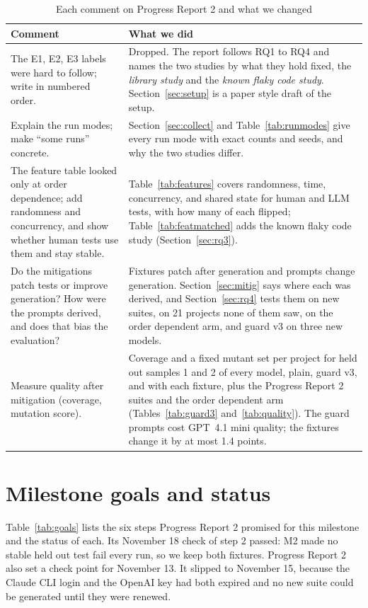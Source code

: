\documentclass[sigconf,nonacm]{acmart}
\begin{document}
\begin{table}[t]
\caption{Each comment on Progress Report 2 and what we changed}
\label{tab:response}
\small
\begin{tabularx}{\textwidth}{p{5.2cm}X}
\toprule
Comment & What we did \\
\midrule
The E1, E2, E3 labels were hard to follow; write in numbered order. & Dropped. The report follows RQ1 to RQ4 and names the two studies by what they hold fixed, the \emph{library study} and the \emph{known flaky code study}. Section~\ref{sec:setup} is a paper style draft of the setup. \\
Explain the run modes; make ``some runs'' concrete. & Section~\ref{sec:collect} and Table~\ref{tab:runmodes} give every run mode with exact counts and seeds, and why the two studies differ. \\
The feature table looked only at order dependence; add randomness and concurrency, and show whether human tests use them and stay stable. & Table~\ref{tab:features} covers randomness, time, concurrency, and shared state for human and LLM tests, with how many of each flipped; Table~\ref{tab:featmatched} adds the known flaky code study (Section~\ref{sec:rq3}). \\
Do the mitigations patch tests or improve generation? How were the prompts derived, and does that bias the evaluation? & Fixtures patch after generation and prompts change generation. Section~\ref{sec:mitig} says where each was derived, and Section~\ref{sec:rq4} tests them on new suites, on 21 projects none of them saw, on the order dependent arm, and guard v3 on three new models. \\
Measure quality after mitigation (coverage, mutation score). & Coverage and a fixed mutant set per project for held out samples 1 and 2 of every model, plain, guard v3, and with each fixture, plus the Progress Report 2 suites and the order dependent arm (Tables~\ref{tab:guard3} and~\ref{tab:quality}). The guard prompts cost GPT~4.1 mini quality; the fixtures change it by at most 1.4 points. \\
\bottomrule
\end{tabularx}
\end{table}

\section{Milestone goals and status}
\label{sec:goals}
Table~\ref{tab:goals} lists the six steps Progress Report 2 promised for this milestone and the status of each. Its November 18 check of step 2 passed: M2 made no stable held out test fail every run, so we keep both fixtures. Progress Report 2 also set a check point for November 13. It slipped to November 15, because the Claude CLI login and the OpenAI key had both expired and no new suite could be generated until they were renewed.
\end{document}
